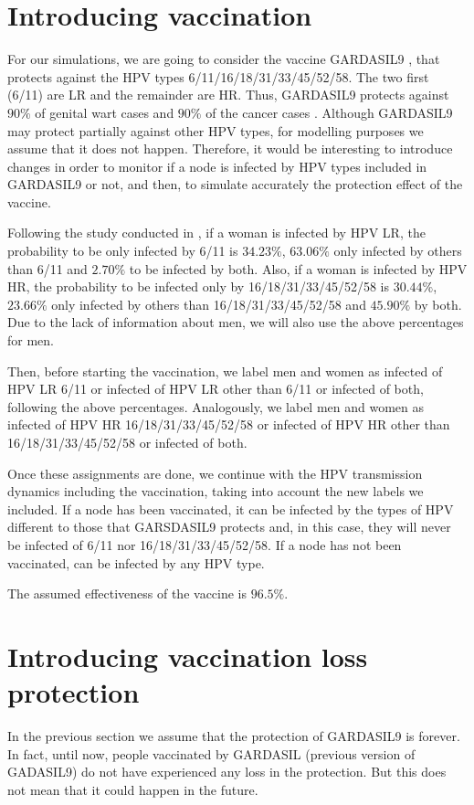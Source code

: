 \section{Introducing vaccination} 
For our simulations, we are going to consider the vaccine GARDASIL9 \cite{gardasil9}, that protects against the HPV types 6/11/16/18/31/33/45/52/58. The two first (6/11) are LR and the remainder are HR. Thus, GARDASIL9 protects against $90\%$ of genital wart cases and $90\%$ of the cancer cases \cite{Hartwig2015}. Although GARDASIL9 may protect partially against other HPV types, for modelling purposes we assume that it does not happen. Therefore, it would be interesting to introduce changes in order to monitor if a node is infected by HPV types included in GARDASIL9 or not, and then, to simulate accurately the protection effect of the vaccine.

Following the study conducted in \cite{castellsague2012prevalence}, if a woman is infected by HPV LR, the probability to be only infected by 6/11 is $34.23\%$, $63.06\%$ only infected by others than 6/11 and $2.70\%$ to be infected by both. Also, if a woman is infected by HPV HR, the probability to be infected only by 16/18/31/33/45/52/58 is $30.44\%$, $23.66\%$ only infected by others than 16/18/31/33/45/52/58 and $45.90\%$ by both. Due to the lack of information about men, we will also use the above percentages for men.

Then, before starting the vaccination, we label men and women as infected of HPV LR 6/11 or infected of HPV LR other than 6/11 or infected of both, following the above percentages. Analogously, we label men and women as infected of HPV HR 16/18/31/33/45/52/58 or infected of HPV HR other than 16/18/31/33/45/52/58 or infected of both.

Once these assignments are done, we continue with the HPV transmission dynamics including the vaccination, taking into account the new labels we included. If a node has been vaccinated, it can be infected by the types of HPV different to those that GARSDASIL9 protects and, in this case, they will never be infected of 6/11 nor 16/18/31/33/45/52/58. If a node has not been vaccinated, can be infected by any HPV type. 

The assumed effectiveness of the vaccine is $96.5\%$.

\section{Introducing vaccination loss protection}
In the previous section we assume that the protection of GARDASIL9 is forever. In fact, until now, people vaccinated by GARDASIL (previous version of GADASIL9) do not have experienced any loss in the protection. But this does not mean that it could happen in the future. 

